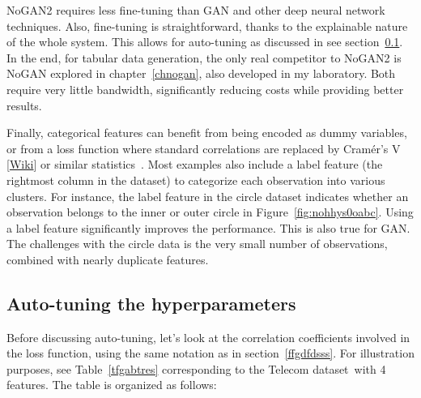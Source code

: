 \documentclass[oneside,10pt]{book}
\begin{document}
 NoGAN2 requires less fine-tuning than GAN and other deep neural network techniques. Also, fine-tuning is straightforward, thanks to the explainable nature of the whole system. This allows for auto-tuning as discussed in see section~\ref{hphjkr}. In the end, for tabular data generation, the only real competitor to NoGAN2 is NoGAN explored in chapter~\ref{chnogan}, also developed in my laboratory. Both require very little bandwidth, significantly reducing costs while providing better results.

Finally, categorical features can benefit from being encoded as dummy variables, or from a loss function where standard correlations are replaced 
 by \textcolor{index}{Cramér's V} [\href{https://mltblog.com/45VfElW}{Wiki}] or similar statistics~\cite{crame17}. Most examples also include a
 \textcolor{index}{label feature} (the rightmost column in the dataset) to categorize each observation into various clusters. For instance, the label feature in the circle dataset indicates whether an observation belongs to the inner or outer circle in Figure~\ref{fig:nohhys0oabc}.
 Using a label feature significantly improves the performance. This is also true for GAN. The challenges with the circle data is the very small number of observations, combined with nearly duplicate features.








\subsection{Auto-tuning the hyperparameters}\label{hphjkr}

Before discussing \textcolor{index}{auto-tuning}, let's look at the correlation coefficients involved in  
the loss function, using the same notation as in section~\ref{ffgdfdsss}. For illustration purposes, see Table~\ref{tfgabtres} corresponding to the
 Telecom dataset~with 4 features. The table is organized as follows: \vspace{1ex}
\end{document}
